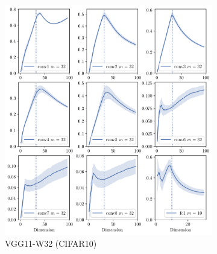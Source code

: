 \begin{figure}[H]
    \centering
    \begin{subfigure}[b]{0.48\textwidth}
        \centering
        \captionsetup{justification=centering}
        \includegraphics[width=\textwidth]{Appendix_Figures/Overlap_large_model/overlap_raw/DimOverlap_CIFAR10_VGG11W32_fixlr0.01_appendix_vertical_3col.pdf}
        \caption{VGG11-W32 (CIFAR10)}
        \label{fig:app_adexp_cifar10_vgg32}
    \end{subfigure}%
    \ \ \ \ \ \
    \begin{subfigure}[b]{0.48\textwidth}
        \centering
        \captionsetup{justification=centering}

\end{subfigure}
\end{figure}
